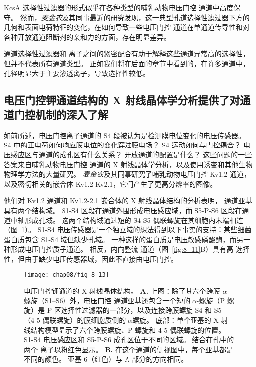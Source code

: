 KcsA 选择性过滤器的形式似乎在各种类型的哺乳动物电压门控  通道中高度保守。
然而，\textit{麦金农}及其同事最近的研究发现，这一典型孔道选择性滤过器下方的几何和表面电荷特征的变化，在如何导致一些电压门控  通道在单通道传导性和对各种开放通道阻断剂的亲和力的方面，存在明显差异。


 通道选择性过滤器和  离子之间的紧密配合有助于解释这些通道异常高的选择性，但并不代表所有通道类型。
正如我们将在后面的章节中看到的，在许多通道中，孔径明显大于主要渗透离子，导致选择性较低。



\subsection{电压门控钾通道结构的 X 射线晶体学分析提供了对通道门控机制的深入了解}

如前所述，电压门控离子通道的 S4 段被认为是检测膜电位变化的电压传感器。
S4 中的正电荷如何响应膜电位的变化穿过膜电场？
S4 运动如何与门控耦合？
电压感应区与通道的成孔区有什么关系？
开放通道的配置是什么？
这些问题的一些答案来自哺乳动物电压门控  通道的 X 射线晶体学分析，以及使用诱变和其他生物物理学方法的大量研究。
\textit{麦金农}及其同事研究了哺乳动物电压门控 Kv1.2  通道，以及密切相关的嵌合体 Kv1.2-Kv2.1，它们产生了更高分辨率的图像。


他们对 Kv1.2 通道和 Kv1.2-2.1 嵌合体的 X 射线晶体结构的分析表明， 通道亚基具有两个结构域。
S1-S4 区段在通道外围形成电压感应域，而 S5-P-S6 区段在通道中轴形成孔域。
这两个结构域通过短的 S4-S5 偶联螺旋在其细胞内末端相连（图~\ref{fig:8_13}）。
S1-S4 电压传感器是一个独立域的想法得到以下事实的支持：某些细菌蛋白质包含 S1-S4 域但缺少孔域。
一种这样的蛋白质是电压敏感磷酸酶，而另一种形成电压门控质子通道。
相反，内向整流  通道（图~\ref{fig:8_11}B）具有高  选择性，但由于缺少电压传感器域，因此不直接由电压门控。


\begin{figure}[htbp]
	\centering
	\texttt{[image: chap08/fig\_8\_13]}
	\caption{电压门控钾通道的 X 射线晶体结构\cite{long2007atomic}。
		\textbf{A.} 上图：除了其六个跨膜 $\alpha$ 螺旋（S1–S6）外，电压门控  通道亚基还包含一个短的 $\alpha$-螺旋（P 螺旋）是 P 区选择性过滤器的一部分，以及连接跨膜螺旋 S4 和 S5（4-5 偶联螺旋）的膜细胞质侧的 $\alpha$螺旋。
		底部：单个亚基的 X 射线结构模型显示了六个跨膜螺旋、P 螺旋和 4-5 偶联螺旋的位置。
		S1-S4 电压感应区和 S5-P-S6 成孔区位于不同的区域。
		结合在孔中的两个  离子以粉红色显示。
		\textbf{B.} 在这个通道的侧视图中，每个亚基都是不同的颜色。
		亚基 6（红色）与 A 部分的方向相同。}
	\label{fig:8_13}
\end{figure}


